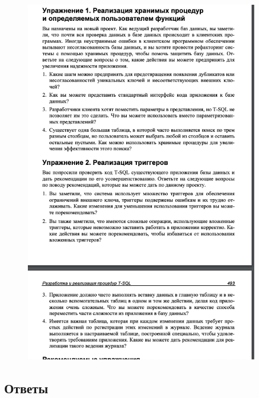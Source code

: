 \begin{figure}[h!]
	\begin{center}
		\includegraphics[width=0.9\textwidth]{img/ex30.png}
	\end{center}
	\captionsetup{justification=centering}
\end{figure}

\subsection*{Ответы}


